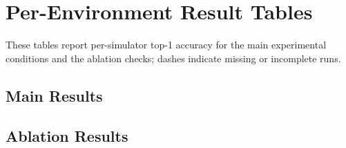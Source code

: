 \section{Per-Environment Result Tables}
\label{app:calibration-result-tables}

\setlength{\floatsep}{6pt plus 2pt minus 2pt}
\setlength{\textfloatsep}{8pt plus 2pt minus 2pt}
\setlength{\intextsep}{6pt plus 2pt minus 2pt}

These tables report per-simulator top-1 accuracy for the main experimental conditions and the ablation checks; dashes indicate missing or incomplete runs.

\subsection{Main Results}

\begin{table}[!htbp]
\centering
\caption{Main experiment accuracy for low-noise direct classification.}
\label{tab:app-calibration-gentle-01234-cloud}

\end{table}

\begin{table}[!htbp]
\centering
\caption{Main experiment accuracy for low-noise code-rule evaluation on visible samples.}
\label{tab:app-calibration-gentle-01234-flame}

\end{table}

\begin{table}[!htbp]
\centering
\caption{Main experiment accuracy for high-noise direct classification.}
\label{tab:app-calibration-gentle-01234-pine}

\end{table}

\begin{table}[!htbp]
\centering
\caption{Main experiment accuracy for high-noise code-rule evaluation on visible samples.}
\label{tab:app-calibration-gentle-01234-orbit}

\end{table}

\subsection{Ablation Results}

\begin{table}[!htbp]
\centering
\caption{Calibration accuracy under noiseless direct classification.}
\label{tab:app-calibration-frost-01234-anchor}

\end{table}

